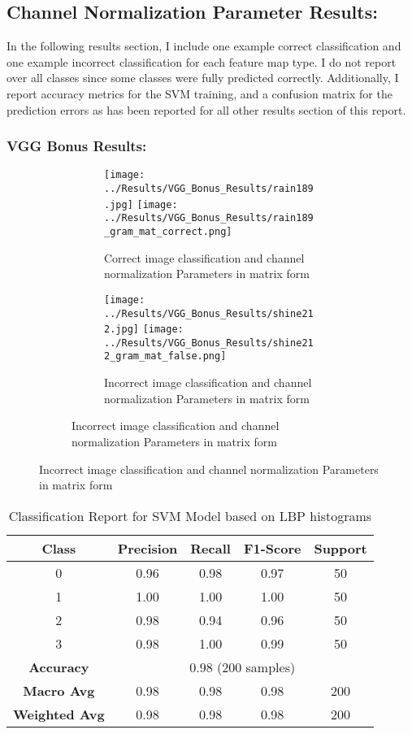 \documentclass{article}
\begin{document}
\subsection{Channel Normalization Parameter Results:}
In the following results section, I include one example correct classification and one example incorrect classification for each feature map type. I do not report over all classes since some classes were fully predicted correctly. Additionally, I report accuracy metrics for the SVM training, and a confusion matrix for the prediction errors as has been reported for all other results section of this report.

\subsubsection{VGG Bonus Results:}
\begin{figure}[H]
    \centering
    \begin{subfigure}{\linewidth}
        \centering
        \begin{subfigure}{0.49\linewidth}
            \centering
            \texttt{[image: ../Results/VGG\_Bonus\_Results/rain189.jpg]}
            \texttt{[image: ../Results/VGG\_Bonus\_Results/rain189\_gram\_mat\_correct.png]}
            \caption*{Correct image classification and channel normalization Parameters in matrix form}
        \end{subfigure}
        \begin{subfigure}{0.49\linewidth}
            \centering
            \texttt{[image: ../Results/VGG\_Bonus\_Results/shine212.jpg]}
            \texttt{[image: ../Results/VGG\_Bonus\_Results/shine212\_gram\_mat\_false.png]}
            \caption*{Incorrect image classification and channel normalization Parameters in matrix form}
        \end{subfigure}
    \end{subfigure}
\end{figure}

\begin{table}[h!]
    \centering
    \begin{tabular}{|c|c|c|c|c|}
        \hline
        Class & Precision & Recall & F1-Score & Support \\
        \hline
        0 & 0.96 & 0.98 & 0.97 & 50 \\
        1 & 1.00 & 1.00 & 1.00 & 50 \\
        2 & 0.98 & 0.94 & 0.96 & 50 \\
        3 & 0.98 & 1.00 & 0.99 & 50 \\
        \hline
        \multicolumn{1}{|c|}{\textbf{Accuracy}} & \multicolumn{4}{c|}{0.98 (200 samples)} \\
        \hline
        \multicolumn{1}{|c|}{\textbf{Macro Avg}} & 0.98 & 0.98 & 0.98 & 200 \\
        \multicolumn{1}{|c|}{\textbf{Weighted Avg}} & 0.98 & 0.98 & 0.98 & 200 \\
        \hline
    \end{tabular}
    \caption{Classification Report for SVM Model based on LBP histograms}
\end{table}
\end{document}
